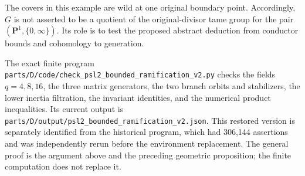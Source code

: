 \begin{remark}
The covers in this example are wild at one original
boundary point.  Accordingly, $G$ is not asserted to
be a quotient of the original-divisor tame group
for the pair $(\mathbf P^1,\{0,\infty\})$.
Its role is to test the proposed abstract deduction
from conductor bounds and cohomology to generation.

The exact finite program
\nolinkurl{parts/D/code/check_psl2_bounded_ramification_v2.py}
checks the fields $q=4,8,16$, the three matrix generators,
the two branch orbits and stabilizers, the lower inertia
filtration, the invariant identities, and the numerical
product inequalities.  Its current output is
\nolinkurl{parts/D/output/psl2_bounded_ramification_v2.json}.
This restored version is separately identified from the
historical program, which had 306,144 assertions and
was independently rerun before the environment replacement.
The general proof is the argument above and the
preceding geometric proposition; the finite computation
does not replace it.
\end{remark}
